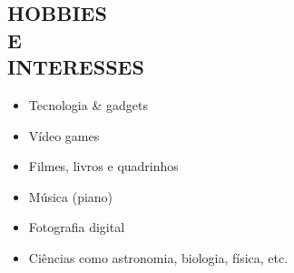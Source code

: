 \documentclass[margin]{res}
\begin{document}
\begin{resume}
		\section{HOBBIES \\ E \\ INTERESSES}
			\begin{itemize}
				\itemsep -2pt
		    	\item Tecnologia \& gadgets
				\item Vídeo games
				\item Filmes, livros e quadrinhos
				\item Música (piano)
				\item Fotografia digital
				\item Ciências como astronomia, biologia, física, etc.
			\end{itemize}
	\end{resume}
\end{document}

